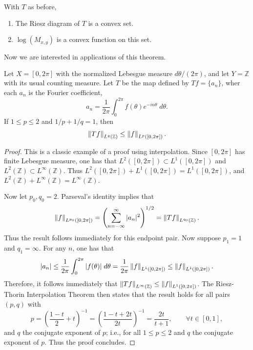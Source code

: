 \documentclass{article}
\begin{document}
\begin{corollary}
	With $T$ as before, \vspace{-0.25cm} 
	\begin{enumerate}[itemsep =-2pt, label = (\alph{*})]
		\item The Riesz diagram of $T$ is a convex set. 
		\item $\log(M_{x, y})$ is a convex function on this set. 
	\end{enumerate}
\end{corollary} 

Now we are interested in applications of this theorem. 

\begin{corollary}
	Let $X = [0,2\pi]$ with the normalized Lebesgue measure $d\theta/(2\pi)$, and let $Y = \mathbb{Z}$ with its usual counting measure. Let $T$ be the map defined by $Tf = \{a_{n}\}$, wher each $a_{n}$ is the Fourier coefficient,  
	\begin{equation*}
		a_{n} = \frac{1}{2\pi} \int_{0}^{2\pi}f(\theta)e^{-in\theta}\;d\theta. 
	\end{equation*} 
	If $1 \leq p \leq 2$ and $1/p + 1/q = 1$, then 
	\begin{equation*}
		\left\Vert Tf \right\Vert_{L^{q}(\mathbb{Z})} \leq \left\Vert f \right\Vert_{L^{p}([0,2\pi])}. 
	\end{equation*} 
\end{corollary} 
\begin{proof}
	This is a classic example of a proof using interpolation. Since $[0,2\pi]$ has finite Lebesgue measure, one has that $L^{2}([0,2\pi]) \subset L^{1}([0,2\pi])$ and $L^{2}(\mathbb{Z}) \subset L^{\infty}(\mathbb{Z})$. Thus $L^{2}([0,2\pi]) + L^{1}([0,2\pi]) = L^{1}([0,2\pi])$, and $L^{2}(\mathbb{Z}) + L^{\infty}(\mathbb{Z}) = L^{\infty}(\mathbb{Z})$. 
	
	Now let $p_{0}, q_{0} = 2$. Parseval's identity implies that 
	\begin{equation*}
		\left\Vert f \right\Vert_{L^{p_{0}}([0,2\pi])} = \left(\sum_{n = -\infty}^{\infty}|a_{n}|^{2}\right)^{1/2} = \left\Vert Tf \right\Vert_{L^{q_{0}}(\mathbb{Z})}. 
	\end{equation*}
	Thus the result follows immediately for this endpoint pair. Now suppose $p_{1} = 1$ and $q_{1} = \infty$. For any $n$, one has that 
	\begin{equation*}
		|a_{n}| \leq \frac{1}{2\pi}\int_{0}^{2\pi}|f(\theta)|\;d\theta = \frac{1}{2\pi}\left\Vert f \right\Vert_{L^{1}([0,2\pi])} \leq \left\Vert f \right\Vert_{L^{1}([0,2\pi])}. 
	\end{equation*} 
	Therefore, it follows immediately that $\left\Vert Tf \right\Vert_{L^{\infty}(\mathbb{Z})} \leq \left\Vert f \right\Vert_{L^{1}([0,2\pi])}$. The Riesz-Thorin Interpolation Theorem then states that the result holds for all pairs $(p, q)$ with 
	\begin{equation*}
		p = \left(\frac{1 - t}{2} + t\right)^{-1} = \left(\frac{1 - t + 2t}{2t}\right)^{-1} = \frac{2t}{t + 1}, \qquad \forall t \in [0,1], 
	\end{equation*} 
	and $q$ the conjugate exponent of $p$; i.e., for all $1 \leq p \leq 2$ and $q$ the conjugate exponent of $p$. Thus the proof concludes. 
\end{proof} 
\end{document}
